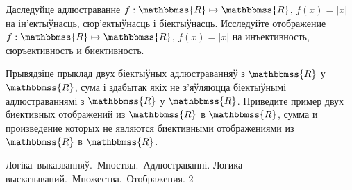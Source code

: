 \begin{problemList}
\problemItemSimple
{Даследуйце адлюстраванне $f: \mathbbmss{R} \mapsto \mathbbmss{R}$, $f(x) = |x|$ на ін'ектыўнасць, сюр'ектыўнасць і біектыўнасць. }
{Исследуйте отображение $f: \mathbbmss{R} \mapsto \mathbbmss{R}$, $f(x) = |x|$ на инъективность, сюръективность и биективность.}

\bigskip

\problemItemSimple
{Прывядзіце прыклад двух біектыўных адлюстраванняў з $\mathbbmss{R}$ у $\mathbbmss{R}$,
сума і здабытак якіх не з'яўляюцца біектыўнымі адлюстраваннямі з $\mathbbmss{R}$ у $\mathbbmss{R}$.}
{Приведите пример двух биективных отображений из $\mathbbmss{R}$ в $\mathbbmss{R}$,
сумма и произведение которых не являются биективными отображениями из $\mathbbmss{R}$ в $\mathbbmss{R}$.}

\end{problemList}

\newpage

\quizTitle
{Логіка~выказванняў.~Мноствы.~Адлюстраванні.}
{Логика высказываний.~Множества.~Отображения.}
{2}

